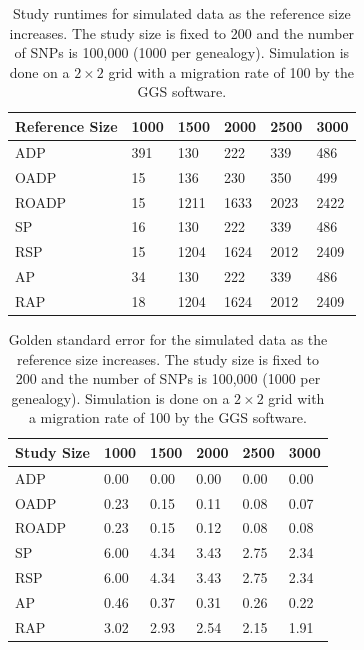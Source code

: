 \documentclass{article}
\begin{document}
\begin{table}
  \centering
  \begin{tabular}{|l|l|l|l|l|l|}
    \hline
    Reference Size & 1000 & 1500 & 2000 & 2500 & 3000 \\
    \hline
    ADP        & 391  &  130 &  222 &  339 &  486 \\
    OADP       & 15   &  136 &  230 &  350 &  499 \\
    ROADP      & 15   & 1211 & 1633 & 2023 & 2422 \\
    SP         & 16   &  130 &  222 &  339 &  486 \\
    RSP        & 15   & 1204 & 1624 & 2012 & 2409 \\
    AP         & 34   &  130 &  222 &  339 &  486 \\
    RAP        & 18   & 1204 & 1624 & 2012 & 2409 \\
    \hline
  \end{tabular}
  \caption{
    Study runtimes for simulated data as the reference size increases.
    The study size is fixed to 200 and the number of SNPs is 100,000 (1000 per genealogy). 
    Simulation is done on a $2 \times 2$ grid with a migration rate of 100 by the GGS software. 
  }
  \label{tbl:nChg-runtimes-study}
\end{table}

\begin{table}
  \centering
  \begin{tabular}{|l|l|l|l|l|l|}
    \hline
    Study Size & 1000  & 1500 & 2000 & 2500 & 3000 \\
    \hline
    ADP        & 0.00  & 0.00 & 0.00 & 0.00 & 0.00 \\
    OADP       & 0.23  & 0.15 & 0.11 & 0.08 & 0.07 \\
    ROADP      & 0.23  & 0.15 & 0.12 & 0.08 & 0.08 \\
    SP         & 6.00  & 4.34 & 3.43 & 2.75 & 2.34 \\
    RSP        & 6.00  & 4.34 & 3.43 & 2.75 & 2.34 \\
    AP         & 0.46  & 0.37 & 0.31 & 0.26 & 0.22 \\
    RAP        & 3.02  & 2.93 & 2.54 & 2.15 & 1.91 \\
    \hline
  \end{tabular}
  \caption{
    Golden standard error for the simulated data as the reference size increases.
    The study size is fixed to 200 and the number of SNPs is 100,000 (1000 per genealogy). 
    Simulation is done on a $2 \times 2$ grid with a migration rate of 100 by the GGS software. 
  }
  \label{tbl:nChg-accuracy-gold}
\end{table}
\end{document}
